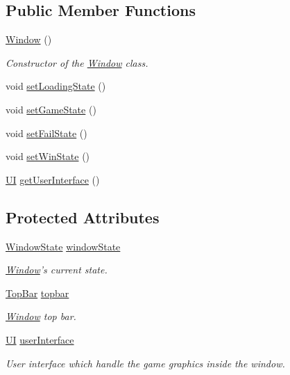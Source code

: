 \subsection*{Public Member Functions}
\begin{DoxyCompactItemize}
\item 
\hyperlink{classwindow_1_1_window_ac92fd9c8fc1bc83c8d8bd8b87eb62213}{Window} ()
\begin{DoxyCompactList}\small\item\em Constructor of the \hyperlink{classwindow_1_1_window}{Window} class. \end{DoxyCompactList}\item 
void \hyperlink{classwindow_1_1_window_a2e2049d1930bb104ec235b0d9ba431fa}{set\-Loading\-State} ()
\item 
void \hyperlink{classwindow_1_1_window_a77e3a4c06b4675bc24eefd91a1faaf11}{set\-Game\-State} ()
\item 
void \hyperlink{classwindow_1_1_window_aa14be01e068317ed09bcbc6d12d8a365}{set\-Fail\-State} ()
\item 
void \hyperlink{classwindow_1_1_window_afc31496382fd285df057838b1e38d1c6}{set\-Win\-State} ()
\item 
\hyperlink{classwindow_1_1ui_1_1_u_i}{U\-I} \hyperlink{classwindow_1_1_window_aab7fb1a0a97c03ddf4e94c5146d4c692}{get\-User\-Interface} ()
\end{DoxyCompactItemize}
\subsection*{Protected Attributes}
\begin{DoxyCompactItemize}
\item 
\hyperlink{enumwindow_1_1_window_state}{Window\-State} \hyperlink{classwindow_1_1_window_aaf636394a965f1a77233071375d4fe44}{window\-State}
\begin{DoxyCompactList}\small\item\em \hyperlink{classwindow_1_1_window}{Window}'s current state. \end{DoxyCompactList}\item 
\hyperlink{classwindow_1_1topbar_1_1_top_bar}{Top\-Bar} \hyperlink{classwindow_1_1_window_a16b715d86f2c4ac44aa84e6e38203bc0}{topbar}
\begin{DoxyCompactList}\small\item\em \hyperlink{classwindow_1_1_window}{Window} top bar. \end{DoxyCompactList}\item 
\hyperlink{classwindow_1_1ui_1_1_u_i}{U\-I} \hyperlink{classwindow_1_1_window_a0021ebc966e051019f4f7c5e4984e77f}{user\-Interface}
\begin{DoxyCompactList}\small\item\em User interface which handle the game graphics inside the window. \end{DoxyCompactList}\end{DoxyCompactItemize}



